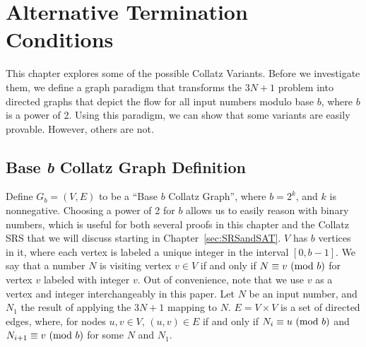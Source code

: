 \chapter{Alternative Termination Conditions} \label{sec:alttercdns}
 This chapter explores some of the possible Collatz Variants. Before we investigate them, we define a graph paradigm that transforms the $3N+1$ problem into directed graphs that depict the flow for all input numbers modulo base $b$, where $b$ is a power of 2. Using this paradigm, we can show that some variants are easily provable. However, others are not.
\section{Base \textit{b} Collatz Graph Definition} \label{subsec:colgraph}
Define $G_b=(V,E)$ to be a ``Base $b$ Collatz Graph'', where $b = 2^k$, and $k$ is nonnegative. Choosing a power of 2 for $b$ allows us to easily reason with binary numbers, which is useful for both several proofs in this chapter and the Collatz SRS that we will discuss starting in Chapter~\ref{sec:SRSandSAT}. $V$ has $b$ vertices in it, where each vertex is labeled a unique integer in the interval $[0, b-1]$. We say that a number $N$ is visiting vertex $v \in V$ if and only if $N \equiv v \ (\mathrm{mod}\ b)$ for vertex $v$ labeled with integer $v$. Out of convenience, note that we use $v$ as a vertex and integer interchangeably in this paper. Let $N$ be an input number, and $N_1$ the result of applying the $3N+1$ mapping to $N$. $E = V \times V$ is a set of directed edges, where, for nodes $u, v \in V$, $(u,v) \in E$ if and only if $N_i \equiv u \ (\mathrm{mod}\ b)$ and $N_{i+1} \equiv v \ (\mathrm{mod}\ b)$ for some $N$ and $N_1$.

